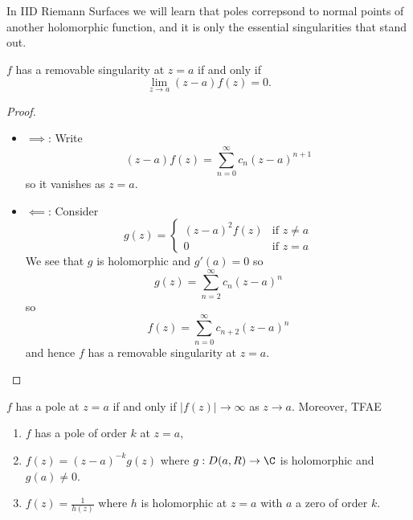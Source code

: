 \documentclass[a4paper]{article}
\begin{document}
In IID Riemann Surfaces we will learn that poles correpsond to normal points of another holomorphic function, and it is only the essential singularities that stand out.

\begin{proposition}
  \(f\) has a removable singularity at \(z = a\) if and only if
  \[
    \lim_{z \to a} (z - a)f(z) = 0.
  \]
\end{proposition}

\begin{proof}\leavevmode
  \begin{itemize}
  \item \(\implies\): Write
    \[
      (z - a)f(z) = \sum_{n = 0}^\infty c_n(z - a)^{n + 1}
    \]
    so it vanishes as \(z = a\).
  \item \(\impliedby\): Consider
    \[
      g(z) =
      \begin{cases}
        (z - a)^2f(z) & \text{if } z \neq a \\
        0 & \text{if } z = a
      \end{cases}
    \]
    We see that \(g\) is holomorphic and \(g'(a) = 0\) so
    \[
      g(z) = \sum_{n = 2}^\infty c_n(z -a)^n
    \]
    so
    \[
      f(z) = \sum_{n = 0}^\infty c_{n + 2}(z - a)^n
    \]
    and hence \(f\) has a removable singularity at \(z = a\).
  \end{itemize}
\end{proof}

\begin{proposition}
  \(f\) has a pole at \(z = a\) if and only if \(|f(z)| \to \infty\) as \(z \to a\). Moreover, TFAE
  \begin{enumerate}
  \item \(f\) has a pole of order \(k\) at \(z = a\),
  \item \(f(z) = (z - a)^{-k}g(z)\) where \(g: D(a, R) \to \C\) is holomorphic and \(g(a) \neq 0\).
  \item \(f(z) = \frac{1}{h(z)}\) where \(h\) is holomorphic at \(z = a\) with \(a\) a zero of order \(k\).
  \end{enumerate}
\end{proposition}
\end{document}
